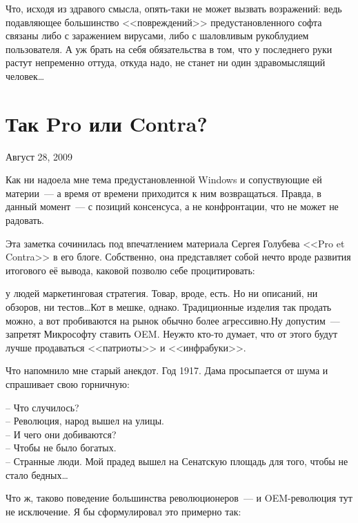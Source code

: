Что, исходя из здравого смысла, опять-таки не может вызвать возражений: ведь подавляющее большинство <<повреждений>> предустановленного софта связаны либо с заражением вирусами, либо с шаловливым рукоблудием пользователя. А уж брать на себя обязательства в том, что у последнего руки растут непременно оттуда, откуда надо, не станет ни один здравомыслящий человек\dots

\section{Так Pro или Contra?} 

\begin{timeline}Август 28, 2009\end{timeline}

Как ни надоела мне тема предустановленной Windows и сопуствующие ей материи~--- а время от времени приходится к ним возвращаться. Правда, в данный момент~--- с позиций консенсуса, а не конфронтации, что не может не радовать.

Эта заметка сочинилась под впечатлением материала Сергея Голубева <<Pro et Contra>> в его блоге. Собственно, она представляет собой нечто вроде развития итогового её вывода, каковой позволю себе процитировать:

\begin{shadequote}{}
 у людей маркетинговая стратегия. Товар, вроде, есть. Но ни описаний, ни обзоров, ни тестов\dots Кот в мешке, однако. Традиционные изделия так продать можно, а вот пробиваются на рынок обычно более агрессивно.Ну допустим~--- запретят Микрософту ставить OEM. Неужто кто-то думает, что от этого будут лучше продаваться <<патриоты>> и <<инфрабуки>>.
\end{shadequote}

Что напомнило мне старый анекдот. Год 1917. Дама просыпается от шума и спрашивает свою горничную:

\begin{shadequote}{}
-- Что случилось? \\
-- Революция, народ вышел на улицы. \\
-- И чего они добиваются? \\
-- Чтобы не было богатых. \\
-- Странные люди. Мой прадед вышел на Сенатскую площадь для того, чтобы не стало бедных\dots
\end{shadequote}

Что ж, таково поведение большинства революционеров~--- и OEM-революция тут не исключение. Я бы сформулировал это примерно так:

